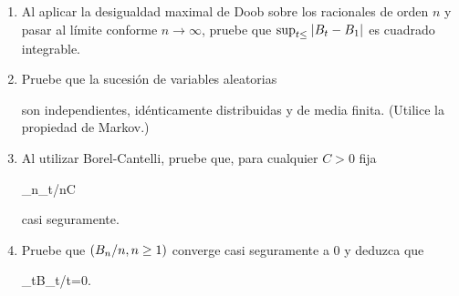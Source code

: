 \begin{problema}
	\mbox{}
	\begin{enumerate}
	\item 
		Al aplicar la desigualdad maximal de Doob sobre los racionales de orden $n$ y pasar al l\'imite conforme $n\to\infty$, pruebe que $\sup_{t\leq }\hspace{.25mm}\left|B_t-B_1\right|\hspace{.25mm}$ es cuadrado integrable.
	
	\item 
		Pruebe que la sucesi\'on de variables aleatorias
		\begin{esn}
		\end{esn}
		son independientes, id\'enticamente distribuidas y de media finita. (Utilice la propiedad de Markov.)
	
	\item 
		Al utilizar Borel-Cantelli, pruebe que, para cualquier $C>0$ fija
		\begin{esn}
			\limsup_{n\to\infty}\sup_{t\in [0,1]}/n\leq C
		\end{esn} casi seguramente.
	
	\item 
		Pruebe que $\left( B_n/n,n\geq 1\right) $ converge casi seguramente a $0$ y deduzca que
		\begin{esn}
			\lim_{t\to\infty }B_t/t=0.
		\end{esn}
	\end{enumerate}
\end{problema}